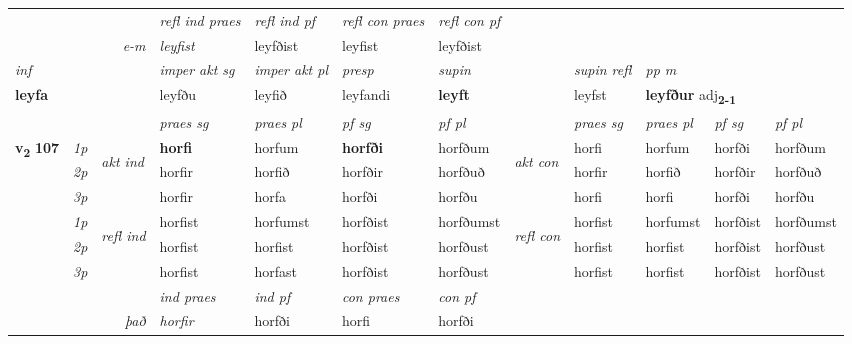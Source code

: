 \begin{longtable}[l]{X>{\footnotesize\itshape}llXXXXlXXXX}
 & && \textit{refl ind praes} & \textit{refl ind pf} & \textit{refl con praes} & \textit{refl con pf} \\*
\multicolumn{3}{r}{\textit{e-m}}& leyfist & leyfðist & leyfist & leyfðist \\*

\cmidrule{4-7}
   {\textit{inf}} & &  & \textit{imper akt sg} & \textit{imper akt pl}   & \textit{presp} & \textit{supin} && \textit{supin refl} & \textit{pp m} \\*
  {\textbf{leyfa}} & && leyfðu  & leyfið   & leyfandi &  \textbf{leyft} && leyfst & \multicolumn{2}{l}{\textbf{leyfður} adj\textbf{\textsubscript{2-1}}} \\*

\midrule

 & &   & \textit{praes sg}  & \textit{praes pl}    & \textit{ pf sg} & \textit{pf pl} & & \textit{praes sg}  & \textit{praes pl}    & \textit{pf sg} & \textit{pf pl }  \\ \cmidrule{4-7} \cmidrule{9-12}
 \multirow{2}{*}{{{\textbf{v{\textsubscript{2}}} \Large{\textbf{107}}}}}  & 1p & \multirow{3}{*}{\begin{turn}{90}\textit{akt ind}\end{turn}} & \textbf{horfi} & horfum & \textbf{horfði} & horfðum & \multirow{3}{*}{\begin{turn}{90}\textit{akt con}\end{turn}} &horfi & horfum & horfði & horfðum\\*
 & 2p &  &  horfir  & horfið & horfðir & horfðuð & & horfir & horfið & horfðir & horfðuð \\*
 & 3p &  & horfir & horfa & horfði & horfðu & & horfi & horfi& horfði & horfðu \\*
\cmidrule{4-7} \cmidrule{9-12}
 & 1p & \multirow{3}{*}{\begin{turn}{90}\textit{refl ind}\end{turn}}  & horfist & horfumst & horfðist & horfðumst & \multirow{3}{*}{\begin{turn}{90}\textit{refl con}\end{turn}}  &horfist & horfumst & horfðist & horfðumst \\*
 & 2p &  & horfist & horfist & horfðist & horfðust & &horfist & horfist & horfðist & horfðust \\*
 & 3p  & & horfist & horfast & horfðist & horfðust & & horfist & horfist& horfðist & horfðust \\*
\cmidrule{4-7} \cmidrule{9-12}

   && &  \textit{ind praes} & \textit{ind pf} & \textit{con praes} & \textit{con pf} \\*
\multicolumn{3}{r}{\textit{það}} & horfir & horfði & horfi & horfði \\*


\end{longtable}
